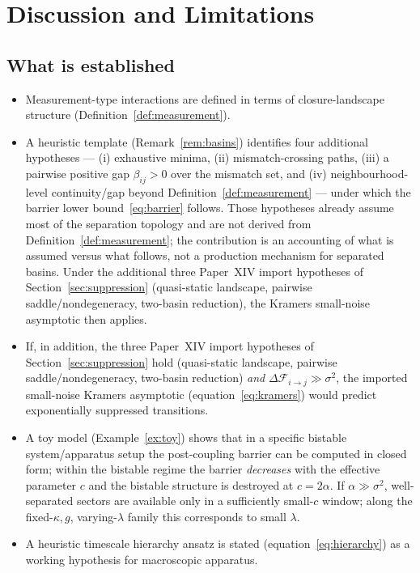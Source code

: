 \documentclass[12pt]{article}
\newcommand{\Fcal}{\mathcal{F}}
\begin{document}
\section{Discussion and Limitations}\label{sec:discussion}

\subsection{What is established}

\begin{itemize}
    \item Measurement-type interactions are defined in terms of closure-landscape structure (Definition~\ref{def:measurement}).
    \item A heuristic template (Remark~\ref{rem:basins}) identifies four additional hypotheses --- (i) exhaustive minima, (ii) mismatch-crossing paths, (iii) a pairwise positive gap $\beta_{ij}>0$ over the mismatch set, and (iv) neighbourhood-level continuity/gap beyond Definition~\ref{def:measurement} --- under which the barrier lower bound~\eqref{eq:barrier} follows. Those hypotheses already assume most of the separation topology and are not derived from Definition~\ref{def:measurement}; the contribution is an accounting of what is assumed versus what follows, not a production mechanism for separated basins. Under the additional three Paper~XIV import hypotheses of Section~\ref{sec:suppression} (quasi-static landscape, pairwise saddle/nondegeneracy, two-basin reduction), the Kramers small-noise asymptotic then applies.
    \item If, in addition, the three Paper~XIV import hypotheses of Section~\ref{sec:suppression} hold (quasi-static landscape, pairwise saddle/nondegeneracy, two-basin reduction) \emph{and} $\Delta\Fcal_{i\to j} \gg \sigma^2$, the imported small-noise Kramers asymptotic (equation~\ref{eq:kramers}) would predict exponentially suppressed transitions.
    \item A toy model (Example~\ref{ex:toy}) shows that in a specific bistable system/apparatus setup the post-coupling barrier can be computed in closed form; within the bistable regime the barrier \emph{decreases} with the effective parameter $c$ and the bistable structure is destroyed at $c = 2\alpha$. If $\alpha \gg \sigma^2$, well-separated sectors are available only in a sufficiently small-$c$ window; along the fixed-$\kappa,g$, varying-$\lambda$ family this corresponds to small $\lambda$.
    \item A heuristic timescale hierarchy ansatz is stated (equation~\ref{eq:hierarchy}) as a working hypothesis for macroscopic apparatus.
\end{itemize}
\end{document}
